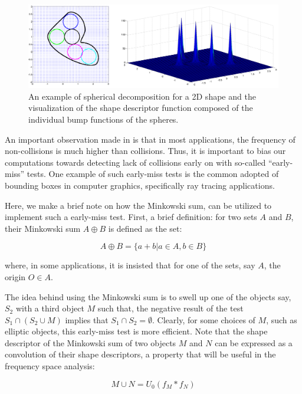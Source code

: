 \documentclass[letterpaper, 10 pt, conference]{ieeeconf}
\begin{document}
\begin{figure}[ht!] 
  \centering
  \includegraphics[width=1.0\linewidth]{Figures/bumpConvolved.png}
  \caption{An example of spherical decomposition for a 2D shape and the visualization of the
  shape descriptor function composed of the individual bump functions of the spheres.}
  \label{fig:bumpConvolved}
\end{figure}

An important observation made in \cite{lysenko2013fourier} is that in most applications, 
the frequency of non-collisions is much higher than collisions. Thus, it is important to bias
our computations towards detecting lack of collisions early on with so-called ``early-miss'' tests.
One example of such early-miss tests is the common adopted of bounding boxes in computer graphics,
specifically ray tracing applications. 

Here, we make a brief note on how the Minkowski sum, can be utilized to implement such a early-miss test. 
First, a brief definition: for two sets $A$ and $B$, their Minkowski sum $A \oplus B$ is defined as
the set:

\begin{equation}
 A \oplus B = \{a+b | a \in A, b \in B\}
\end{equation}

\noindent where, in some applications, it is insisted that for one of the sets, say $A$, the origin $O \in A$. 

The idea behind using the Minkowski sum is to swell up one of the objects say, $S_2$ with a third object
$M$ such that, the negative result of the test $S_1 \cap (S_2 \cup M)$ implies that $S_1 \cap S_2 = \emptyset$.
Clearly, for some choices of $M$, such as elliptic objects, this early-miss test is more efficient. 
Note that the shape descriptor of the Minkowski sum of two objects $M$ and $N$ can be expressed as a convolution of their shape descriptors, a property
that will be useful in the frequency space analysis:

\begin{equation}
M \cup N = U_0(f_M \ast f_N)  
\end{equation}
\end{document}
